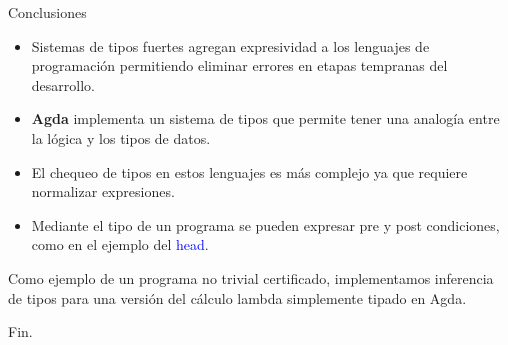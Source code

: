 \documentclass[xcolor=dvipsnames]{beamer} %
\newcommand{\cf}[1]{\textcolor{blue}{#1}}
\begin{document}
\begin{frame}
 
 \begin{block}{Conclusiones}
  \begin{itemize}
  \pause
  
   \item Sistemas de tipos fuertes agregan expresividad a los lenguajes de programación
    permitiendo eliminar errores en etapas tempranas del desarrollo.
    
   \pause
    
   \item \textbf{Agda} implementa un sistema de tipos que permite tener una analogía entre la lógica y los 
   tipos de datos.
   
   \pause
   
   \item El chequeo de tipos en estos lenguajes es más complejo ya que requiere normalizar expresiones.
   
   \pause
   
   \item Mediante el tipo de un programa se pueden expresar pre y post condiciones, como en el ejemplo
   del \cf{head}.
  \end{itemize}

 \end{block}

 \pause
 
 \begin{block}{}
  Como ejemplo de un programa no trivial certificado, implementamos inferencia de tipos para una versión del cálculo
  lambda simplemente tipado en Agda.
 \end{block}

 
\end{frame}

\begin{frame}{}
\begin{center}
 \Huge Fin.
\end{center}
\end{frame}
\end{document}
